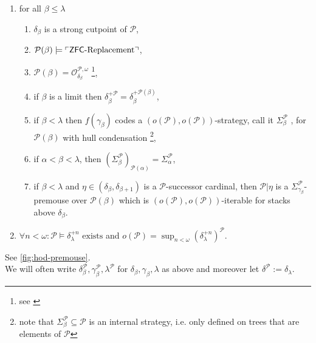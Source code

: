 \documentclass[../../main]{subfiles}
\begin{document}
{\begin{enumerate}
  \item for all $\beta \le \lambda$
    \begin{enumerate}      
    \item $\delta_{\beta}$ is a strong cutpoint  of $\mathcal{P}$,
    \item $\mathcal{P}(\beta) \models \ulcorner \textsf{ZFC}\text{-Replacement} \urcorner$,
    \item
      $\mathcal{P}(\beta) = \mathcal{O}^{\mathcal{P},
        \omega}_{\delta_{\beta}}$ \footnote{see
        \cite[Definition~1.26]{sargsyan2015hod}},
    \item if $\beta$ is a limit then
      $\delta_{\beta}^{+\mathcal{P}} = \delta_{\beta}^{+
        \mathcal{P}(\beta)}$,
    \item if $\beta < \lambda$ then $f(\gamma_{\beta})$ codes a
      $(o(\mathcal{P}), o(\mathcal{P}))$-strategy, call it
      $\Sigma^{\mathcal{P}}_{\beta}$ ,
       for $\mathcal{P}(\beta)$
      with hull condensation \footnote{note that
        $\Sigma^{\mathcal{P}}_{\beta} \subseteq \mathcal{P}$ is an
        internal strategy, i.e. only defined on trees that are
        elements of $\mathcal{P}$},
    \item \label{defi:agreement of internal iteration strategy} if $\alpha < \beta < \lambda$, then
      $(\Sigma^{\mathcal{P}}_{\beta})_{\mathcal{P(\alpha)}} =
      \Sigma^{\mathcal{P}}_{\alpha}$, 
    \item if $\beta < \lambda$ and
      $\eta \in (\delta_{\beta}, \delta_{\beta+1})$ is a
      $\mathcal{P}$-successor cardinal, then $\mathcal{P} | \eta$ is a
      $\Sigma^{\mathcal{P}}_{\gamma_{\beta}}$-premouse over
      $\mathcal{P}(\beta)$ which is
      $(o(\mathcal{P}), o(\mathcal{P}))$-iterable for stacks above
      $\delta_{\beta}$.
    \end{enumerate}
  \item
    $\forall n < \omega \colon \mathcal{P} \models
    \delta_{\lambda}^{+n} \text{ exists}$ and
    $o(\mathcal{P}) = \sup_{n < \omega}
    (\delta_{\lambda}^{+n})^{\mathcal{P}}$.
  \end{enumerate}
  See \autoref{fig:hod-premouse}. \\
  We will often write
  $\delta^{\mathcal{P}}_{\beta}, \gamma_{\beta}^{\mathcal{P}},
  \lambda^{\mathcal{P}}$ for $\delta_{\beta}, \gamma_{\beta}, \lambda$
  as above and moreover let
  $\delta^{\mathcal{P}} := \delta_{\lambda}$.  }
\end{document}
